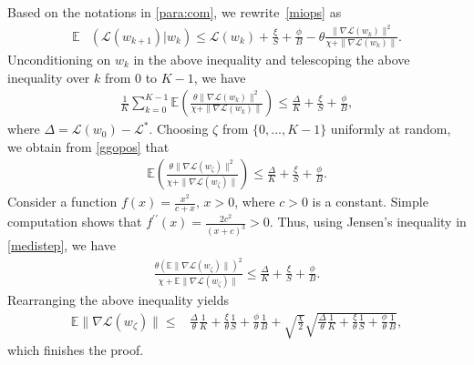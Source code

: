 \documentclass{osudissert96}
\begin{document}
	Based on the notations in \cref{para:com}, we rewrite~\cref{miops} as  
	\begin{align*}
	\mathbb{E}&( \mathcal{L}(w_{k+1})| w_k) \leq \mathcal{L}(w_{k}) + \frac{\xi}{S} +  \frac{\phi }{B}	-\theta \frac{  \|\nabla \mathcal{L}(w_k) \|^2}{\chi +\|\nabla \mathcal{L}(w_k) \|}.
	\end{align*}
	Unconditioning on $w_k$ in the above inequality and  
	telescoping the above inequality over $k$ from $0$ to $K-1$, we have 
	\begin{align}\label{ggopos}
	\frac{1}{K}\sum_{k=0}^{K-1} \mathbb{E}\left(\frac{ \theta \|\nabla \mathcal{L}(w_k) \|^2}{\chi +\|\nabla \mathcal{L}(w_k) \|}\right) \leq \frac{\Delta}{K} +    \frac{\xi}{S} +  \frac{\phi }{B},
	\end{align}
	where $\Delta = \mathcal{L}(w_0) - \mathcal{L}^*$. 
	Choosing $\zeta$  from $\{0,...,K-1\}$ uniformly at random, we obtain from \cref{ggopos} that 
	\begin{align}\label{medistep}
	\mathbb{E}\left(\frac{ \theta \|\nabla \mathcal{L}(w_\zeta) \|^2}{\chi +\|\nabla \mathcal{L}(w_\zeta) \|}\right) \leq \frac{\Delta}{K} +    \frac{\xi}{S} +  \frac{\phi }{B}.
	\end{align}
	Consider a function $f(x) = \frac{x^2}{c+x}, \,x>0$, where $c>0$ is a constant. Simple computation shows that $f^{\prime\prime}(x) =\frac{2c^2}{(x+c)^3}>0$. Thus, using Jensen's inequality in \cref{medistep}, we have 
	\begin{align}\label{reoolls}
	\frac{ \theta (\mathbb{E}\|\nabla \mathcal{L}(w_\zeta) \|)^2}{\chi +\mathbb{E}\|\nabla \mathcal{L}(w_\zeta) \|} \leq \frac{\Delta}{K} +    \frac{\xi}{S} +  \frac{\phi }{B}.
	\end{align}
	Rearranging the above inequality yields
	\begin{align}\label{havetogo}
	\mathbb{E}\|\nabla \mathcal{L}(w_\zeta) \|  \leq &\frac{\Delta}{\theta }\frac{1}{K} +    \frac{\xi}{\theta}\frac{1}{S} +  \frac{\phi }{\theta}\frac{1}{B} + \sqrt{\frac{\chi}{2} }\sqrt{\frac{\Delta}{\theta }\frac{1}{K} +    \frac{\xi}{\theta}\frac{1}{S} +  \frac{\phi }{\theta}\frac{1}{B}},
	\end{align}
	which finishes the proof.
\end{document}

